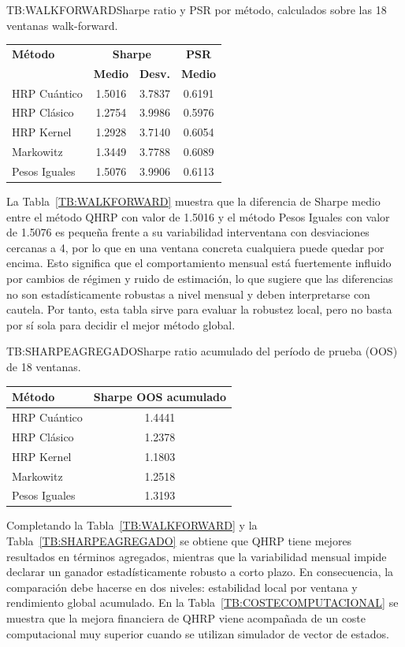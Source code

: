 \begin{table}[Sharpe y PSR por ventana walk-forward]{TB:WALKFORWARD}{Sharpe ratio y PSR por método, calculados sobre las 18 ventanas walk-forward.}
\begin{tabular}{lccc}
\hline
\textbf{Método} & \multicolumn{2}{c}{\textbf{Sharpe}} & \textbf{PSR} \\
 & \textbf{Medio} & \textbf{Desv.} & \textbf{Medio} \\
\hline
HRP Cuántico & 1.5016 & 3.7837 & 0.6191 \\
HRP Clásico & 1.2754 & 3.9986 & 0.5976 \\
HRP Kernel & 1.2928 & 3.7140 & 0.6054 \\
Markowitz & 1.3449 & 3.7788 & 0.6089 \\
Pesos Iguales & 1.5076 & 3.9906 & 0.6113 \\
\hline
\end{tabular}
\end{table}

La Tabla~\ref{TB:WALKFORWARD} muestra que la diferencia de Sharpe medio entre el método \gls{QHRP} con valor de 1.5016 y el método Pesos Iguales con valor de 1.5076 es pequeña frente a su variabilidad interventana con desviaciones cercanas a 4, por lo que en una ventana concreta cualquiera puede quedar por encima. Esto significa que el comportamiento mensual está fuertemente influido por cambios de régimen y ruido de estimación, lo que sugiere que las diferencias no son estadísticamente robustas a nivel mensual y deben interpretarse con cautela. Por tanto, esta tabla sirve para evaluar la robustez local, pero no basta por sí sola para decidir el mejor método global.

\begin{table}[Sharpe acumulado \gls{OOS}]{TB:SHARPEAGREGADO}{Sharpe ratio acumulado del período de prueba (\gls{OOS}) de 18 ventanas.}
\begin{tabular}{lc}
\hline
\textbf{Método} & \textbf{Sharpe \gls{OOS} acumulado} \\
\hline
HRP Cuántico & 1.4441 \\
HRP Clásico & 1.2378 \\
HRP Kernel & 1.1803 \\
Markowitz & 1.2518 \\
Pesos Iguales & 1.3193 \\
\hline
\end{tabular}
\end{table}

Completando la Tabla~\ref{TB:WALKFORWARD} y la Tabla~\ref{TB:SHARPEAGREGADO} se obtiene que \gls{QHRP} tiene mejores resultados en términos agregados, mientras que la variabilidad mensual impide declarar un ganador estadísticamente robusto a corto plazo. En consecuencia, la comparación debe hacerse en dos niveles: estabilidad local por ventana y rendimiento global acumulado. En la Tabla~\ref{TB:COSTECOMPUTACIONAL} se muestra que la mejora financiera de \gls{QHRP} viene acompañada de un coste computacional muy superior cuando se utilizan simulador de vector de estados.

